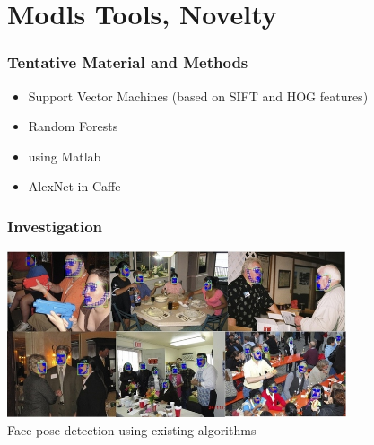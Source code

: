 \documentclass{beamer}
\begin{document}
			
			
			
	
	\section{Modls Tools, Novelty}	

    \begin{frame}
        \frametitle{Tentative Material and Methods}
        \begin{itemize}
            \item Support Vector Machines (based on SIFT and HOG features)
            \item Random Forests
            \item using Matlab
            \item AlexNet in Caffe
        \end{itemize}

    \end{frame}

    \begin{frame}
		\frametitle{Investigation}
        \begin{center}
        \includegraphics[width=10cm]{images/FacePose.jpg}\\
        Face pose detection using existing algorithms\end{center}
    \end{frame}
\end{document}
